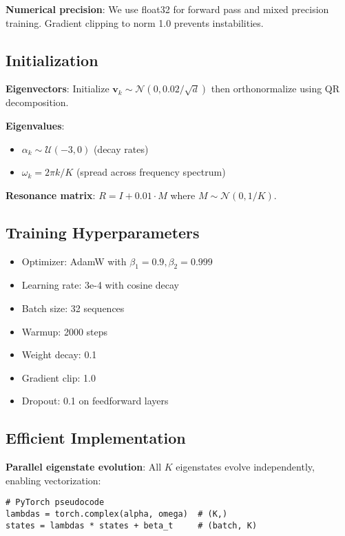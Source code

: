 \documentclass[11pt,letterpaper]{article}
\begin{document}
\textbf{Numerical precision}: We use float32 for forward pass and mixed precision training. Gradient clipping to norm 1.0 prevents instabilities.

\subsection{Initialization}

\textbf{Eigenvectors}: Initialize $\mathbf{v}_k \sim \mathcal{N}(0, 0.02/\sqrt{d})$ then orthonormalize using QR decomposition.

\textbf{Eigenvalues}: 
\begin{itemize}
    \item $\alpha_k \sim \mathcal{U}(-3, 0)$ (decay rates)
    \item $\omega_k = 2\pi k / K$ (spread across frequency spectrum)
\end{itemize}

\textbf{Resonance matrix}: $R = I + 0.01 \cdot M$ where $M \sim \mathcal{N}(0, 1/K)$.

\subsection{Training Hyperparameters}

\begin{itemize}
    \item Optimizer: AdamW with $\beta_1=0.9, \beta_2=0.999$
    \item Learning rate: 3e-4 with cosine decay
    \item Batch size: 32 sequences
    \item Warmup: 2000 steps
    \item Weight decay: 0.1
    \item Gradient clip: 1.0
    \item Dropout: 0.1 on feedforward layers
\end{itemize}

\subsection{Efficient Implementation}

\textbf{Parallel eigenstate evolution}: All $K$ eigenstates evolve independently, enabling vectorization:
\begin{verbatim}
# PyTorch pseudocode
lambdas = torch.complex(alpha, omega)  # (K,)
states = lambdas * states + beta_t     # (batch, K)
\end{verbatim}
\end{document}
